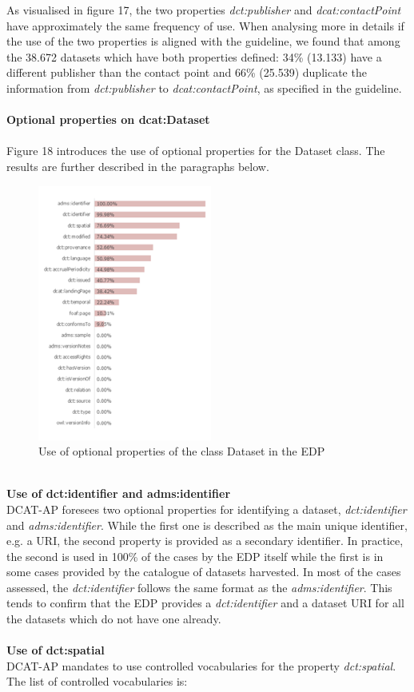 \documentclass[<options>]{elsarticle}
\begin{document}
As visualised in figure 17, the two properties \textit{dct:publisher} and \textit{dcat:contactPoint} have approximately the same frequency of use. When analysing more in details if the use of the two properties is aligned with the guideline, we found that among the 38.672 datasets which have both properties defined: 34\% (13.133) have a different publisher than the contact point and 66\% (25.539) duplicate the information from \textit{dct:publisher} to \textit{dcat:contactPoint}, as specified in the guideline.\\
\\
\textbf{Optional properties on dcat:Dataset}
\\
\\
Figure 18 introduces the use of optional properties for the Dataset class. The results are further described in the paragraphs below.
\\
\begin{figure}[!h]
\includegraphics{replace21.png}
\caption{Use of optional properties of the class Dataset in the EDP}
\end{figure}
\\
\textbf{Use of dct:identifier and adms:identifier}\\
DCAT-AP foresees two optional properties for identifying a dataset, \textit{dct:identifier} and \textit{adms:identifier}. While the first one is described as the main unique identifier, e.g. a URI, the second property is provided as a secondary identifier. In practice, the second is used in 100\% of the cases by the EDP itself while the first is in some cases provided by the catalogue of datasets harvested. In most of the cases assessed, the \textit{dct:identifier} follows the same format as the \textit{adms:identifier}. This tends to confirm that the EDP provides a \textit{dct:identifier} and a dataset URI for all the datasets which do not have one already.
\\
\\
\textbf{Use of dct:spatial}\\
DCAT-AP mandates to use controlled vocabularies for the property \textit{dct:spatial}. The list of controlled vocabularies is:
\end{document}
